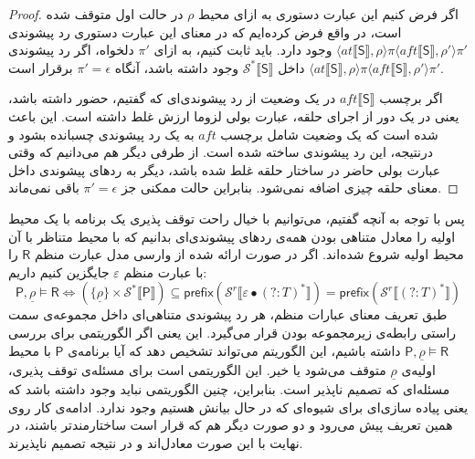 \begin{proof}
اگر فرض کنیم این عبارت‌ دستوری به ازای محیط $\rho$ در حالت اول متوقف شده است، در واقع فرض کرده‌ایم که در معنای این عبارت‌ دستوری رد پیشوندی 
$\langle at \llbracket \mathsf{S} \rrbracket , \rho \rangle \pi \langle aft \llbracket \mathsf{S} \rrbracket , \rho' \rangle \pi'$ 
وجود دارد.
باید ثابت کنیم، به ازای $\pi'$ دلخواه، اگر رد پیشوندی
$\langle at \llbracket \mathsf{S} \rrbracket , \rho \rangle \pi \langle aft \llbracket \mathsf{S} \rrbracket , \rho' \rangle \pi'$ 
داخل 
$\mathcal{S^*}\llbracket \mathsf{S} \rrbracket$
وجود داشته باشد، آنگاه
$\pi'=\epsilon$
برقرار است.

اگر برچسب
$aft \llbracket \mathsf{S} \rrbracket$
در یک وضعیت از رد پیشوندی‌ای که گفتیم، حضور داشته باشد، یعنی در یک دور از اجرای حلقه، عبارت بولی لزوما ارزش غلط داشته است. این باعث شده است که یک وضعیت شامل برچسب $aft$ به یک رد پیشوندی چسبانده بشود و درنتیجه، این رد پیشوندی ساخته شده است. از طرفی دیگر هم می‌دانیم که وقتی عبارت بولی حاضر در ساختار حلقه غلط شده باشد، دیگر به ردهای پیشوندی داخل معنای حلقه چیزی اضافه نمی‌شود. بنابراین حالت ممکنی جز $\pi'=\epsilon$ باقی نمی‌ماند. 
\end{proof}

پس با توجه به آنچه گفتیم، می‌توانیم با خیال راحت توقف پذیری یک برنامه با یک محیط اولیه را معادل متناهی بودن همه‌ی ردهای پیشوندی‌ای بدانیم که با محیط متناظر با آن محیط اولیه شروع شده‌اند.
اگر در صورت ارائه شده از وارسی مدل عبارت منظم $\mathsf{R}$ را با عبارت منظم $\varepsilon$ جایگزین کنیم داریم:
$$\mathsf{P},\underline{\rho} \models \mathsf{R}
\Leftrightarrow
(\{\underline{\rho}\}\times \mathcal{S}^* \llbracket \mathsf{P}\rrbracket) \subseteq 
\mathsf{prefix} (\mathcal{S}^r \llbracket \varepsilon \bullet (?:\mathit{T})^*\rrbracket)
=\mathsf{prefix} (\mathcal{S}^r \llbracket (?:\mathit{T})^*\rrbracket)$$
طبق تعریف معنای عبارات منظم، هر رد پیشوندی متناهی‌ای داخل مجموعه‌ی سمت راستی رابطه‌ی زیرمجموعه بودن قرار می‌گیرد. این یعنی اگر الگوریتمی برای بررسی 
$\mathsf{P} , \underline{\rho} \models \mathsf{R} $
داشته باشیم، این الگوریتم می‌تواند تشخیص دهد که آیا برنامه‌ی $\mathsf{P}$ با محیط اولیه‌ی $\underline{\rho}$ متوقف می‌شود یا خیر. این الگوریتمی است برای مسئله‌ی توقف پذیری، مسئله‌ای که تصمیم ناپذیر است. بنابراین، چنین الگوریتمی نباید وجود داشته باشد که یعنی پیاده سازی‌ای برای شیوه‌ای که در حال بیانش هستیم وجود ندارد. ادامه‌ی کار روی همین تعریف پیش می‌رود و دو صورت دیگر هم که قرار است ساختارمندتر باشند، در نهایت با این صورت معادل‌اند و در نتیجه تصمیم ناپذیرند.














